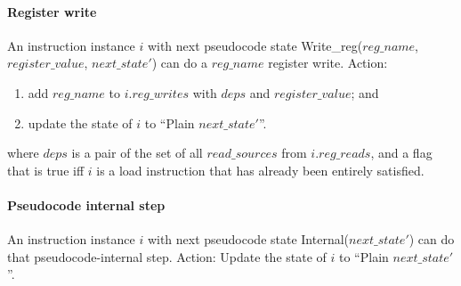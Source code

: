 \paragraph{Register write}\label{omm:reg_write}
An instruction instance $i$ with next pseudocode state {\sc Write\_reg}($reg\_name$, $register\_value$, $next\_state'$) can do a $reg\_name$ register write.
Action:
\begin{enumerate}
\item add $reg\_name$ to $i.reg\_writes$ with $deps$ and $register\_value$; and
\item update the state of $i$ to ``{\sc Plain} $next\_state'$''.
\end{enumerate}
where $deps$ is a pair of the set of all $read\_sources$ from
$i.reg\_reads$, and a flag that is true iff $i$ is a load instruction
that has already been entirely satisfied.


\paragraph{Pseudocode internal step}\label{omm:sail_interp}
An instruction instance $i$ with next pseudocode state {\sc Internal}($next\_state'$) can do that pseudocode-internal step.
Action: Update the state of $i$ to ``{\sc Plain} $next\_state'$''.


